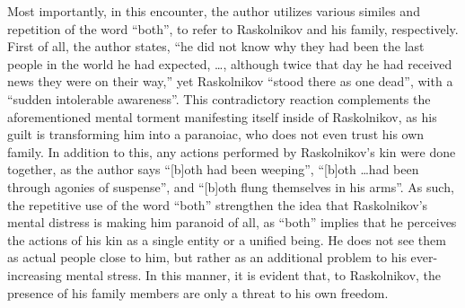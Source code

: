 \documentclass[12pt]{article}
\begin{document}
\begin{enumerate}
\begin{justify}
      Most importantly, in this encounter, the author utilizes various similes and repetition of the word “both”, to refer to Raskolnikov and his family, respectively. First of all, the author states, “he did not know why they had been the last people in the world he had expected, \dots, although twice that day he had received news they were on their way,” yet Raskolnikov “stood there as one dead”, with a “sudden intolerable awareness”. This contradictory reaction complements the aforementioned mental torment manifesting itself inside of Raskolnikov, as his guilt is transforming him into a paranoiac, who does not even trust his own family. In addition to this, any actions performed by Raskolnikov's kin were done together, as the author says “[b]oth had been weeping”, “[b]oth \dots had been through agonies of suspense”, and “[b]oth flung themselves in his arms”. As such, the repetitive use of the word “both” strengthen the idea that Raskolnikov's mental distress is making him paranoid of all, as “both” implies that he perceives the actions of his kin as a single entity or a unified being. He does not see them as actual people close to him, but rather as an additional problem to his ever-increasing mental stress. In this manner, it is evident that, to Raskolnikov, the presence of his family members are only a threat to his own freedom.

    \end{justify}

\end{enumerate}
\end{document}
